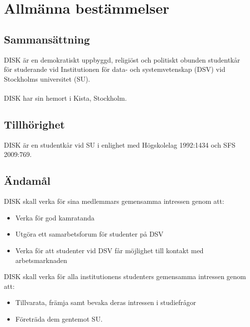 \clearpage
\section{Allmänna bestämmelser}
\label{sec:allmannabestammelser}

        \subsection{Sammansättning}
        \label{subsec:sammansattning}
                DISK är en demokratiskt uppbyggd, religiöst och politiskt obunden studentkår för studerande vid Institutionen för data- och systemvetenskap (DSV) vid Stockholms universitet (SU).\\ \\
                DISK har sin hemort i Kista, Stockholm.

        \subsection{Tillhörighet}
        \label{subsec:tillhorighet}
                DISK är en studentkår vid SU i enlighet med Högskolelag 1992:1434 och SFS 2009:769.

        \subsection{Ändamål}
        \label{subsec:andamal}
                DISK skall verka för sina medlemmars gemensamma intressen genom att:
                \begin{itemize}
                \setlength{\itemsep}{0.0cm}
                \setlength{\parskip}{0.0cm}
                        \item Verka för god kamratanda
                        \item Utgöra ett samarbetsforum för studenter på DSV
                        \item Verka för att studenter vid DSV får möjlighet till kontakt med arbetsmarknaden
                \end{itemize}

                DISK skall verka för alla institutionens studenters gemensamma intressen genom att:
                \begin{itemize}
                \setlength{\itemsep}{0.0cm}
                \setlength{\parskip}{0.0cm}
                        \item Tillvarata, främja samt bevaka deras intressen i studiefrågor
                        \item Företräda dem gentemot SU.
                \end{itemize}

